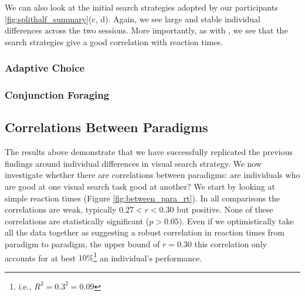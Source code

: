 \documentclass[]{rsos}%
\begin{document}
We can also look at the initial search strategies adopted by our participants \ref{fig:splithalf_summary}(c, d). Again, we see large and stable individual differences across the two sessions. More importantly, as with \cite{nowakowsak2017}, we see that the search strategies give a good correlation with reaction times. 


\subsubsection{Adaptive Choice}

\subsubsection{Conjunction Foraging}


\subsection{Correlations Between Paradigms}

The results above demonstrate that we have successfully replicated the previous findings around individual differences in visual search strategy. We now investigate whether there are correlations between paradigms: are individuals who are good at one visual search task good at another? We start by looking at simple reaction times (Figure \ref{fig:between_para_rt}). In all comparisons the correlations are weak, typically $0.27 < r <0.30$ but positive. None of these correlations are statistically significant ($p>0.05$). Even if we optimistically take all the data together as suggesting a robust correlation in reaction times from paradigm to paradigm, the upper bound of $r=0.30$ this correlation only accounts for at best $10\%$\footnote{i.e., $R^2 = 0.3^2 = 0.09$} an individual's performance. 
\end{document}
